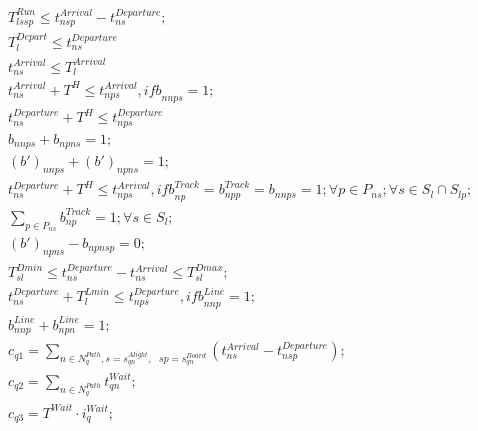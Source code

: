 \begin{align}
  & T_{\mathit{ls} sp}^{R u n} \leq t_{n sp}^{A r r i v a l} - t_{\mathit{ns}}^{D e p a r t u r e} ; \tag{eq\_0004} \\
  & T_{l}^{D e p a r t} \leq t_{\mathit{ns}}^{D e p a r t u r e} \tag{eq\_0005\_a} \\
  & t_{\mathit{ns}}^{A r r i v a l} \leq T_{l}^{A r r i v a l} \tag{eq\_0005\_b} \\
  & t_{\mathit{ns}}^{A r r i v a l} + T^{H} \leq t_{np s}^{A r r i v a l} , \mathit{ifb}_{n np s} = 1 ; \tag{eq\_0006} \\
  & t_{\mathit{ns}}^{D e p a r t u r e} + T^{H} \leq t_{np s}^{D e p a r t u r e} \tag{eq\_0007} \\
  & b_{n np s} + b_{np n s} = 1 ; \tag{eq\_0008} \\
  & \left(b '\right)_{n np s} + \left(b '\right)_{np n s} = 1 ; \tag{eq\_0009} \\
  & t_{\mathit{ns}}^{D e p a r t u r e} + T^{H} \leq t_{np s}^{A r r i v a l} , \mathit{ifb}_{\mathit{np}}^{T r a c k} = b_{np p}^{T r a c k} = b_{n np s} = 1 ; \forall p \in \mathbf{\mathit{P}}_{\mathit{ns}} ; \forall s \in \mathbf{\mathit{S}}_{l} \cap \mathbf{\mathit{S}}_{lp} ; \tag{eq\_0010} \\
  & \underset{p \in \mathbf{\mathit{P}}_{\mathit{ns}}}{\sum} b_{\mathit{np}}^{T r a c k} = 1 ; \forall s \in \mathbf{\mathit{S}}_{l} ; \tag{eq\_0011} \\
  & \left(b '\right)_{np n s} - b_{np n sp} = 0 ; \tag{eq\_0012} \\
  & T_{\mathit{sl}}^{D m i n} \leq t_{\mathit{ns}}^{D e p a r t u r e} - t_{\mathit{ns}}^{A r r i v a l} \leq T_{\mathit{sl}}^{D m a x} ; \tag{eq\_0013} \\
  & t_{\mathit{ns}}^{D e p a r t u r e} + T_{l}^{L m i n} \leq t_{np s}^{D e p a r t u r e} , \mathit{ifb}_{n np}^{L i n e} = 1 ; \tag{eq\_0014} \\
  & b_{n np}^{L i n e} + b_{np n}^{L i n e} = 1 ; \tag{eq\_0015} \\
  & c_{q 1} = \sum_{n \in \mathbf{\mathit{N}}_{q}^{P a t h} , s = s_{\mathit{qn}}^{A l i g h t} ,\textrm{ } sp = s_{\mathit{qn}}^{B o a r d}} \left(t_{\mathit{ns}}^{A r r i v a l} - t_{n sp}^{D e p a r t u r e}\right) ; \tag{eq\_0016} \\
  & c_{q 2} = \sum_{n \in \mathbf{\mathit{N}}_{q}^{P a t h}} t_{\mathit{qn}}^{W a i t} ; \tag{eq\_0017} \\
  & c_{q 3} = T^{W a i t} \cdot i_{q}^{W a i t} ; \tag{eq\_0018} \\

\end{align}
